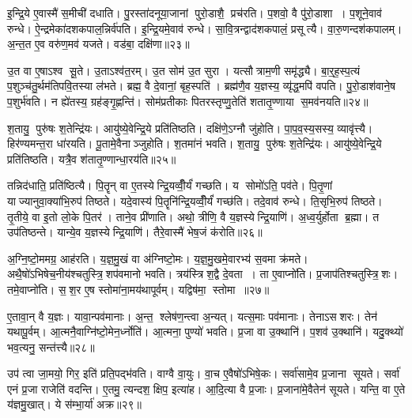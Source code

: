 इ॒न्द्रि॒ये ए॒वास्मै॑ स॒मीची॑ दधाति। पु॒रस्ता॑दनूया॒जानां पुरो॒डाशै॒ प्रच॑रति। प॒शवो॒ वै पु॑रो॒डाशा। प॒शूने॒वाव॑ रुन्धे। ऐ॒न्द्रमेका॑दशकपाल॒न्निर्व॑पति। इ॒न्द्रि॒यमे॒वाव॑ रुन्धे। सा॒वि॒त्रन्द्वाद॑शकपालं॒ प्रसूत्यै। वा॒रु॒णन्दश॑कपालम्। अ॒न्त॒त ए॒व वरु॑ण॒मव॑ यजते। वड॑बा॒ दक्षि॑णा॥२३॥

उ॒त वा ए॒षाऽश्व सू॒ते। उ॒ताऽश्व॑त॒रम्। उ॒त सोम॑ उ॒त सुरा। यत्सौत्राम॒णी समृ॑द्ध्यै। बा॒र्॒ह॒स्प॒त्यं प॒शुञ्च॑तु॒र्थम॑तिपवि॒तस्या ल॑भते। ब्रह्म॒ वै दे॒वानां॒ बृह॒स्पति॑। ब्रह्म॑णै॒व य॒ज्ञस्य॒ व्यृ॑द्ध॒मपि॑ वपति। पु॒रो॒डाश॑वाने॒ष प॒शुर्भ॑वति। न ह्ये॑तस्य॒ ग्रह॑ङ्गृ॒ह्णन्ति॑। सोम॑प्रतीकाः पितरस्तृप्णु॒तेति॑ शतातृ॒ण्णाया स॒मव॑नयति॥२४॥

श॒तायु॒ पुरु॑षः श॒तेन्द्रि॑यः। आयु॑ष्ये॒वेन्द्रि॒ये प्रति॑तिष्ठति। दक्षि॑णे॒ऽग्नौ जु॑होति। पा॒प॒व॒स्य॒सस्य॒ व्यावृ॑त्त्यै। हिर॑ण्यमन्त॒रा धा॑रयति। पू॒तामे॒वैनाञ्जुहोति। श॒तमा॑नं भवति। श॒तायु॒ पुरु॑षः श॒तेन्द्रि॑यः। आयु॑ष्ये॒वेन्द्रि॒ये प्रति॑तिष्ठति। यत्रै॒व श॑तातृ॒ण्णान्धा॒रय॑ति॥२५॥

तन्निद॑धाति॒ प्रति॑ष्ठित्यै। पि॒तॄन् वा ए॒तस्येन्द्रि॒यव्वीँ॒र्यं॑ गच्छति। य सोमो॑ऽति॒ पव॑ते। पि॒तृ॒णां याज्यानुवा॒क्या॑भि॒रुप॑ तिष्ठते। यदे॒वास्य॑ पि॒तॄनि॑न्द्रि॒यव्वीँ॒र्यं॑ गच्छ॑ति। तदे॒वाव॑ रुन्धे। ति॒सृभि॒रुप॑ तिष्ठते। तृ॒तीये॒ वा इ॒तो लो॒के पि॒तर॑। ताने॒व प्री॑णाति। अथो॒ त्रीणि॒ वै य॒ज्ञस्येन्द्रि॒याणि॑। अ॒ध्व॒र्युर्\mbox{}होता ब्र॒ह्मा। त उप॑तिष्ठन्ते। यान्ये॒व य॒ज्ञस्येन्द्रि॒याणि॑। तैरे॒वास्मै॑ भेष॒जं क॑रोति॥२६॥\anuvakamend[प्री॒णा॒ति॒ प्र॒थ॒मो दक्षि॑णा स॒मव॑नयति धा॒रय॑तीन्द्रि॒याणि॑ च॒त्वारि॑ च]

अ॒ग्नि॒ष्टो॒ममग्र॒ आह॑रति। य॒ज्ञ॒मु॒खं वा अ॑ग्निष्टो॒मः। य॒ज्ञ॒मु॒खमे॒वारभ्य॑ स॒वमा क्र॑मते। अथै॒षो॑ऽभिषेच॒नीय॑श्चतुस्त्रि॒शप॑वमानो भवति। त्रय॑स्त्रिश॒द्वै दे॒वता। ता ए॒वाप्नो॑ति। प्र॒जाप॑तिश्चतुस्त्रि॒शः। तमे॒वाप्नो॑ति। स॒श॒र ए॒ष स्तोमा॑ना॒मय॑थापूर्वम्। यद्विष॑मा॒ स्तोमा॥२७॥

ए॒तावा॒न् वै य॒ज्ञः। यावा॒न्पव॑मानाः। अ॒न्त॒ श्लेष॑ण॒न्त्वा अ॒न्यत्। यत्स॒माः पव॑मानाः। तेनाऽसशरः। तेन॑ यथापू॒र्वम्। आ॒त्मनै॒वाग्नि॑ष्टो॒मेन॒र्ध्नोति॑। आ॒त्मना॒ पुण्यो॑ भवति। प्र॒जा वा उ॒क्थानि॑। प॒शव॑ उ॒क्थानि॑। यदु॒क्थ्यो॑ भव॒त्यनु॒ सन्त॑त्त्यै॥२८॥\anuvakamend[स्तोमा प॒शव॑ उ॒क्थान्येकं च]

उप॑ त्वा जा॒मयो॒ गिर॒ इति॑ प्रति॒पद्भ॑वति। वाग्वै वा॒युः। वा॒च ए॒वैषो॑ऽभिषे॒कः। सर्वा॑सामे॒व प्र॒जाना सूयते। सर्वा॑ एनं प्र॒जा राजेति॑ वदन्ति। ए॒तमु॒ त्यन्दश॒ क्षिप॒ इत्या॑ह। आ॒दि॒त्या वै प्र॒जाः। प्र॒जाना॑मे॒वैतेन॑ सूयते। यन्ति॒ वा ए॒ते य॑ज्ञमु॒खात्। ये स॑म्भा॒र्या॑ अक्र\sn{}॥२९॥


